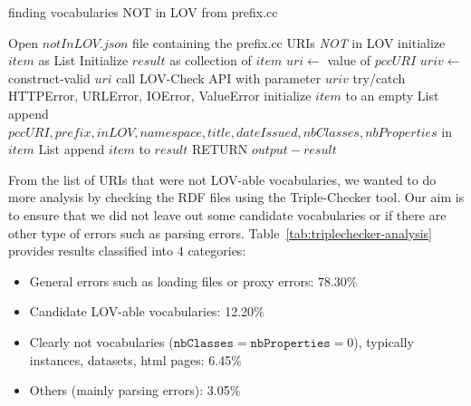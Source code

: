 \begin{algorithm}[H]
\caption{finding vocabularies NOT in LOV from prefix.cc}
\label{findvocabInPrefix-algorithm}
\begin{algorithmic}[1]
    \STATE Open $notInLOV.json$ file containing the prefix.cc URIs \emph{NOT} in LOV
    \STATE initialize $item$ as List
    \STATE Initialize $result$ as collection of $item$
      \STATE $uri \leftarrow$ value of $pccURI$
      \STATE $uriv \leftarrow$ construct-valid $uri$
      \STATE call LOV-Check API with parameter $uriv$
      \STATE try/catch HTTPError, URLError, IOError, ValueError
        \STATE initialize $item$ to an empty List
        \STATE append $pccURI, prefix, inLOV, namespace, title, dateIssued, nbClasses, nbProperties$ in $item$ List
        \STATE append $item$ to $result$
      \ENDWHILE
    \ENDFOR
    \STATE RETURN $output-result$
\end{algorithmic}
\end{algorithm}

From the list of URIs that were not LOV-able vocabularies, we wanted to do more analysis by checking the RDF files using the Triple-Checker tool. Our aim is to ensure that  we did not leave out some candidate vocabularies or if there are other type of errors such as parsing errors. Table~\ref{tab:triplechecker-analysis} provides results classified into $4$ categories:
\begin{itemize}
 \item General errors such as loading files or proxy errors: 78.30\%
 \item Candidate LOV-able vocabularies: 12.20\%
 \item Clearly not vocabularies ($\texttt{nbClasses} = \texttt{nbProperties} = 0 $), typically instances, datasets, html pages: 6.45\%
 \item Others (mainly parsing errors): 3.05\%
\end{itemize}

\begin{table}
\end{table}

